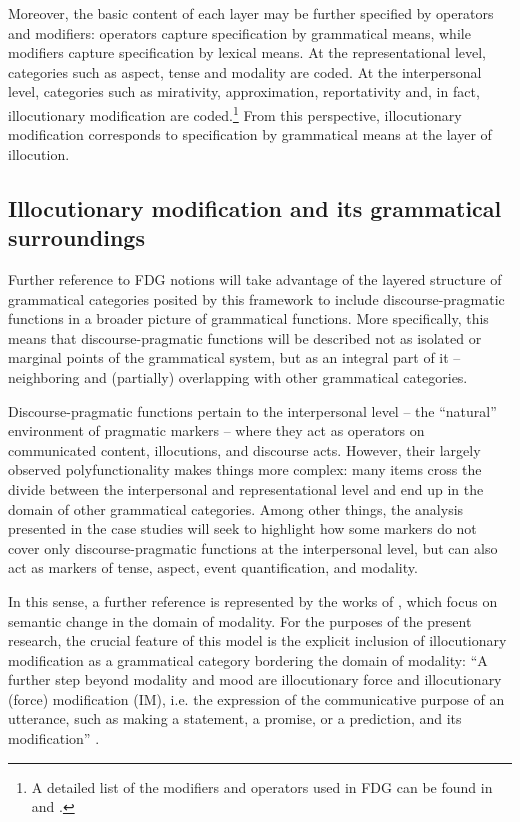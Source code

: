 Moreover, the basic content of each layer may be further specified by operators and modifiers: operators capture specification by grammatical means, while modifiers capture specification by lexical means. At the representational level, categories such as aspect, tense and modality are coded. At the interpersonal level, categories such as mirativity, approximation, reportativity and, in fact, illocutionary modification are coded.\footnote{A detailed list of the modifiers and operators used in FDG can be found in \citet[492]{Hattnher2015} and \citet[17]{Hengeveld2017}.} From this perspective, illocutionary modification corresponds to specification by grammatical means at the layer of illocution.

\subsection{Illocutionary modification and its grammatical surroundings}
\hypertarget{Toc124860625}{}
Further reference to FDG notions will take advantage of the layered structure of grammatical categories posited by this framework to include discourse-pragmat\-ic functions in a broader picture of grammatical functions. More specifically, this means that discourse-pragmatic functions will be described not as isolated or marginal points of the grammatical system, but as an integral part of it – neighboring and (partially) overlapping with other grammatical categories.

Discourse-pragmatic functions pertain to the interpersonal level – the “natural” environment of pragmatic markers – where they act as operators on communicated content, illocutions, and discourse acts. However, their largely observed polyfunctionality makes things more complex: many items cross the divide between the interpersonal and representational level and end up in the domain of other grammatical categories. Among other things, the analysis presented in the case studies will seek to highlight how some markers do not cover only discourse-pragmatic functions at the interpersonal level, but can also act as markers of tense, aspect, event quantification, and modality.

In this sense, a further reference is represented by the works of \citet{Narrog2012,Narrog2017}, which focus on semantic change in the domain of modality. For the purposes of the present research, the crucial feature of this model is the explicit inclusion of illocutionary modification as a grammatical category bordering the domain of modality: “A further step beyond modality and mood are illocutionary force and illocutionary (force) modification (IM), i.e. the expression of the communicative purpose of an utterance, such as making a statement, a promise, or a prediction, and its modification” \citep[13]{Narrog2012}.

